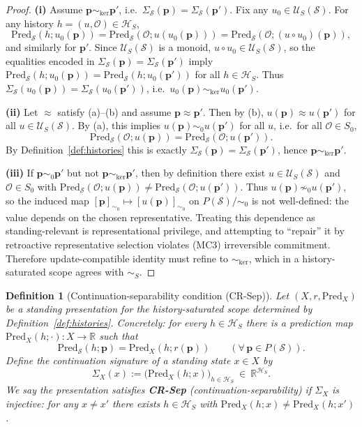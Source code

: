 \documentclass[11pt]{article}
\newtheorem{definition}{Definition}[section]
\theoremstyle{remark}
\newcommand{\Skin}{\mathcal{S}}
\begin{document}
\begin{proof}
\textbf{(i)} Assume $\mathbf{p}\sim_{\ker}\mathbf{p}'$, i.e.\ $\Sigma_{\Skin}(\mathbf{p})=\Sigma_{\Skin}(\mathbf{p}')$.
Fix any $u_0\in\mathcal{U}_S(\Skin)$.
For any history $h=(u,\mathcal{O})\in\mathcal{H}_S$,
\[
\mathrm{Pred}_{\Skin}(h;u_0(\mathbf{p}))
=\mathrm{Pred}_{\Skin}(\mathcal{O};u(u_0(\mathbf{p})))
=\mathrm{Pred}_{\Skin}(\mathcal{O};(u\circ u_0)(\mathbf{p})),
\]
and similarly for $\mathbf{p}'$.
Since $\mathcal{U}_S(\Skin)$ is a monoid, $u\circ u_0\in\mathcal{U}_S(\Skin)$, so the equalities encoded in
$\Sigma_{\Skin}(\mathbf{p})=\Sigma_{\Skin}(\mathbf{p}')$ imply
$\mathrm{Pred}_{\Skin}(h;u_0(\mathbf{p}))=\mathrm{Pred}_{\Skin}(h;u_0(\mathbf{p}'))$ for all $h\in\mathcal{H}_S$.
Thus $\Sigma_{\Skin}(u_0(\mathbf{p}))=\Sigma_{\Skin}(u_0(\mathbf{p}'))$, i.e.\ $u_0(\mathbf{p})\sim_{\ker}u_0(\mathbf{p}')$.

\textbf{(ii)} Let $\approx$ satisfy (a)--(b) and assume $\mathbf{p}\approx \mathbf{p}'$.
Then by (b), $u(\mathbf{p})\approx u(\mathbf{p}')$ for all $u\in\mathcal{U}_S(\Skin)$.
By (a), this implies $u(\mathbf{p})\sim_{0}u(\mathbf{p}')$ for all $u$, i.e.\ for all $\mathcal{O}\in S_0$,
\[
\mathrm{Pred}_{\Skin}(\mathcal{O};u(\mathbf{p}))=\mathrm{Pred}_{\Skin}(\mathcal{O};u(\mathbf{p}')).
\]
By Definition~\ref{def:histories} this is exactly $\Sigma_{\Skin}(\mathbf{p})=\Sigma_{\Skin}(\mathbf{p}')$, hence $\mathbf{p}\sim_{\ker}\mathbf{p}'$.

\textbf{(iii)} If $\mathbf{p}\sim_{0}\mathbf{p}'$ but not $\mathbf{p}\sim_{\ker}\mathbf{p}'$, then by definition there exist
$u\in\mathcal{U}_S(\Skin)$ and $\mathcal{O}\in S_0$ with
$\mathrm{Pred}_{\Skin}(\mathcal{O};u(\mathbf{p}))\neq \mathrm{Pred}_{\Skin}(\mathcal{O};u(\mathbf{p}'))$.
Thus $u(\mathbf{p})\not\sim_{0}u(\mathbf{p}')$, so the induced map $[\mathbf{p}]_{\sim_0}\mapsto [u(\mathbf{p})]_{\sim_0}$ on
$P(\Skin)/\!\sim_0$ is not well-defined: the value depends on the chosen representative.
Treating this dependence as standing-relevant is representational privilege, and attempting to ``repair'' it by retroactive representative selection violates (MC3) irreversible commitment.
Therefore update-compatible identity must refine to $\sim_{\ker}$, which in a history-saturated scope agrees with $\sim_S$.
\end{proof}


\begin{definition}[Continuation-separability condition \textnormal{(CR-Sep)}]\label{def:cr-sep}
Let $(X,r,\mathrm{Pred}_X)$ be a standing presentation for the history-saturated scope determined by
Definition~\ref{def:histories}. Concretely: for every $h\in\mathcal{H}_S$ there is a prediction map
$\mathrm{Pred}_X(h;\cdot):X\to\mathbb{R}$ such that
\[
\mathrm{Pred}_{\Skin}(h;\mathbf{p})=\mathrm{Pred}_X(h;r(\mathbf{p}))
\qquad (\forall\,\mathbf{p}\in P(\Skin)).
\]
Define the \emph{continuation signature} of a standing state $x\in X$ by
\[
\Sigma_X(x) := \big(\mathrm{Pred}_X(h;x)\big)_{h\in\mathcal{H}_S}\ \in\ \mathbb{R}^{\mathcal{H}_S}.
\]
We say the presentation satisfies \textbf{CR-Sep} (continuation-separability) if $\Sigma_X$ is injective:
for any $x\neq x'$ there exists $h\in\mathcal{H}_S$ with $\mathrm{Pred}_X(h;x)\neq \mathrm{Pred}_X(h;x')$.
\end{definition}
\end{document}
